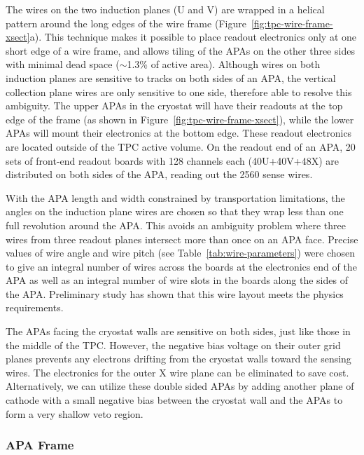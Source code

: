 The wires on the two induction planes (U and V) are wrapped in a
helical pattern around the long edges of the wire frame
(Figure~\ref{fig:tpc-wire-frame-xsect}a). This technique makes it
possible to place readout electronics only at one short edge of a wire
frame, and allows tiling of the APAs on the other three sides with
minimal dead space ($\sim$1.3\% of active area).  Although wires on
both induction planes are sensitive to tracks on both sides of an APA,
the vertical collection plane wires are only sensitive to one side,
therefore able to resolve this ambiguity.  The upper APAs in the
cryostat will have their readouts at the top edge of the frame (as
shown in Figure~\ref{fig:tpc-wire-frame-xsect}), while the lower APAs
will mount their electronics at the bottom edge.  These readout
electronics are located outside of the TPC active volume.  On the
readout end of an APA, 20 sets of front-end readout boards with 128
channels each (40U+40V+48X) are distributed on both sides of the APA,
reading out the 2560 sense wires.

With the APA length and width constrained by transportation
limitations, the angles on the induction plane wires are chosen so
that they wrap less than one full revolution around the APA.  This
avoids an ambiguity problem where three wires from three readout
planes intersect more than once on an APA face.  Precise values of
wire angle and wire pitch (see Table~\ref{tab:wire-parameters}) were
chosen to give an integral number of wires across the boards at the
electronics end of the APA as well as an integral number of wire slots
in the boards along the sides of the APA.  Preliminary
study\cite{wire-orientation} has shown that this wire layout meets the
physics requirements.

The APAs facing the cryostat walls are sensitive on both sides, just
like those in the middle of the TPC.  However, the negative bias
voltage on their outer grid planes prevents any electrons drifting
from the cryostat walls toward the sensing wires.  The electronics for
the outer X wire plane can be eliminated to save cost.  Alternatively, we can
utilize these double sided APAs by adding another plane of cathode
with a small negative bias between the cryostat wall and the APAs to
form a very shallow veto region.




\subsubsection{APA Frame}
\label{subsec:fd-ref-apaframes}

